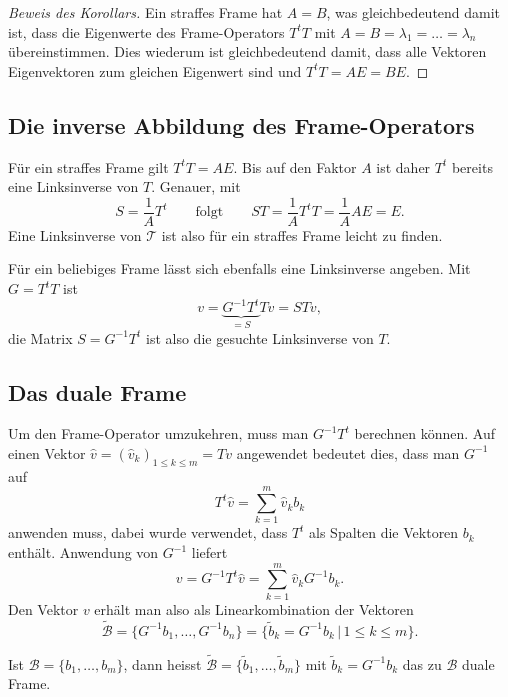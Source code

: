 \begin{proof}[Beweis des Korollars]
Ein straffes Frame hat $A=B$, was gleichbedeutend damit ist, dass
die Eigenwerte des Frame-Operators $T^tT$ mit 
$A=B=\lambda_1=\dots=\lambda_n$ übereinstimmen.
Dies wiederum ist gleichbedeutend damit, dass alle Vektoren Eigenvektoren
zum gleichen Eigenwert sind und $T^tT=AE=BE$.
\end{proof}

\subsection{Die inverse Abbildung des Frame-Operators}
Für ein straffes Frame gilt $T^tT  = AE$.
Bis auf den Faktor $A$ ist daher $T^t$ bereits eine Linksinverse von $T$.
Genauer, mit
\[
S=\frac1{A} T^t
\qquad\text{folgt}\qquad
ST
=
\frac1{A} T^tT
=
\frac1{A} AE
=
E.
\]
Eine Linksinverse von $\mathcal{T}$ ist also für ein straffes Frame
leicht zu finden.

Für ein beliebiges Frame lässt sich ebenfalls eine Linksinverse angeben.
Mit $G=T^tT$ ist
\[
v
=
\underbrace{G^{-1}T^t}_{\displaystyle=S}Tv
=
STv,
\]
die Matrix $S=G^{-1}T^t$ ist also die gesuchte Linksinverse von $T$.

\subsection{Das duale Frame}
Um den Frame-Operator umzukehren, muss man $G^{-1}T^t$ berechnen
können.
Auf einen Vektor $\hat{v} = (\hat{v}_k)_{1\le k\le m} = Tv$ angewendet
bedeutet dies, dass man $G^{-1}$ auf
\[
T^t \hat{v} = \sum_{k=1}^m \hat{v}_k  b_k
\]
anwenden muss, dabei wurde verwendet, dass $T^t$ als Spalten die
Vektoren $b_k$ enthält.
Anwendung von $G^{-1}$ liefert
\[
v
=
G^{-1} T^t \hat{v}
=
\sum_{k=1}^m \hat{v}_k G^{-1}b_k.
\]
Den Vektor $v$ erhält man also als Linearkombination der Vektoren
\[
\tilde{\mathcal{B}}
=
\{ G^{-1}b_1,\dots,G^{-1}b_n\}
=
\{ \tilde{b}_k = G^{-1}b_k\,|\, 1\le k\le m\}.
\]

\begin{definition}
\label{definition:dualesframe}
Ist $\mathcal{B}=\{b_1,\dots,b_m\}$, dann heisst
$\tilde{\mathcal{B}} = \{\tilde{b}_1,\dots,\tilde{b}_m\}$ 
mit
$\tilde{b}_k=G^{-1} b_k$
das zu $\mathcal{B}$ duale Frame.
\end{definition}


